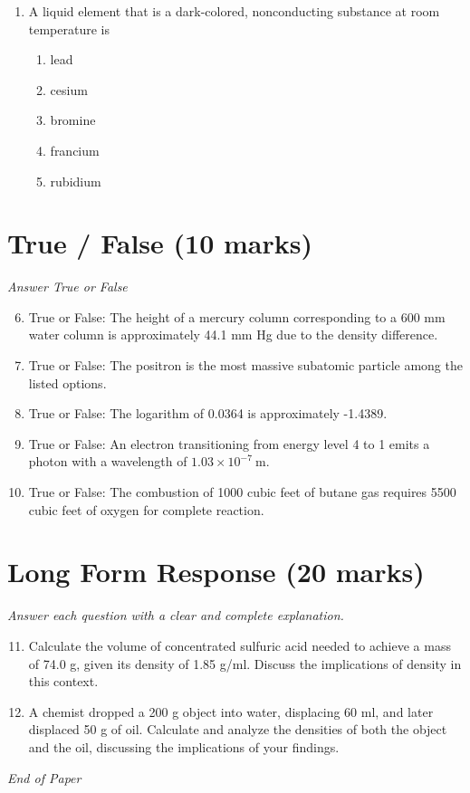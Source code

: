 \documentclass[12pt]{article}
\begin{document}
\begin{enumerate}[label=\arabic*.]
\begin{enumerate}[label=(\alph*)]
    \item 169 $\mathrm{g} \mathrm{mol}^{-1}$
    \item 123 $\mathrm{g} \mathrm{mol}^{-1}$
    \item 200 $\mathrm{g} \mathrm{mol}^{-1}$
    \item 150 $\mathrm{g} \mathrm{mol}^{-1}$
    \item 190 $\mathrm{g} \mathrm{mol}^{-1}$
\end{enumerate}
\item A liquid element that is a dark-colored, nonconducting substance at room temperature is
\begin{enumerate}[label=(\alph*)]
    \item lead
    \item cesium
    \item bromine
    \item francium
    \item rubidium
\end{enumerate}
\end{enumerate}

\section*{True / False (10 marks)}
\textit{Answer True or False}
\begin{enumerate}[label=\arabic*.]
\setcounter{enumi}{5}
\item True or False: The height of a mercury column corresponding to a 600 mm water column is approximately 44.1 mm Hg due to the density difference.
\item True or False: The positron is the most massive subatomic particle among the listed options.
\item True or False: The logarithm of 0.0364 is approximately -1.4389.
\item True or False: An electron transitioning from energy level 4 to 1 emits a photon with a wavelength of $1.03 \times 10^{-7} \mathrm{~m}$.
\item True or False: The combustion of 1000 cubic feet of butane gas requires 5500 cubic feet of oxygen for complete reaction.
\end{enumerate}

\section*{Long Form Response (20 marks)}
\textit{Answer each question with a clear and complete explanation.}
\begin{enumerate}[label=\arabic*.]
\setcounter{enumi}{10}
\item Calculate the volume of concentrated sulfuric acid needed to achieve a mass of 74.0 g, given its density of 1.85 g/ml. Discuss the implications of density in this context.
\item A chemist dropped a 200 g object into water, displacing 60 ml, and later displaced 50 g of oil. Calculate and analyze the densities of both the object and the oil, discussing the implications of your findings.
\end{enumerate}

\vfill
\noindent\textit{End of Paper}
\end{document}
